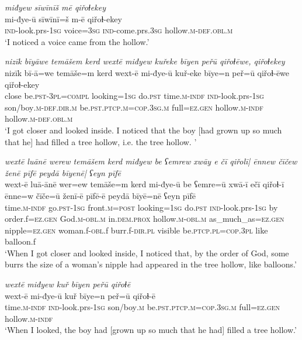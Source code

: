 \ea \label{ZQ.37}
\textit{miđyew sīwīnīš mē qiřoɫekey} \\ 
\gll mi-đye-ū sīwīnī=š m-ē qiřoɫ-ekey \\ 
 \textsc{ind-}look.prs\textsc{-\textsc{1sg}} voice\textsc{=3sg} \textsc{ind-}come.prs\textsc{.3sg} hollow\textsc{.m}\textsc{-def}\textsc{.obl}\textsc{.m} \\ 
\glt `I noticed a voice came from the hollow.'
\z 
 
\ea \label{ZQ.38}
\textit{nizīk bīyāwe temāšem kerd wextē miđyew kuřeke bīyen peřū qiřoɫēwe, qiřoɫekey} \\ 
\gll nizīk bī-ā=we temāše=m kerd wext-ē mi-đye-ū kuř-eke bīye=n peř=ū qiřoɫ-ēwe qiřoɫ-ekey \\ 
 close be\textsc{.pst}\textsc{-3pl}\textsc{=compl} looking\textsc{=\textsc{1sg}} do\textsc{.pst} time\textsc{.m}\textsc{-indf} \textsc{ind-}look.prs\textsc{-\textsc{1sg}} son/boy\textsc{.m}\textsc{-def}\textsc{.dir}\textsc{.m} be\textsc{.pst}\textsc{.ptcp}\textsc{.m}\textsc{=cop}\textsc{.3sg}\textsc{.m} full\textsc{=ez.gen} hollow\textsc{.m}\textsc{-indf} hollow\textsc{.m}\textsc{-def}\textsc{.obl}\textsc{.m} \\ 
\glt `I got closer and looked inside. I noticed that the boy [had grown up so much that he] had filled a tree hollow, i.e. the tree hollow. '
\z 
 
\ea \label{ZQ.39}
\textit{wextē luānē werew temāšem kerd miđyew be ʕemrew xwāy e čī qiřolī| ēnnew čīčew ženē pīfē peydā bīyenē| ʕeyn pīfē} \\ 
\gll wext-ē luā-ānē wer=ew temāše=m kerd mi-đye-ū be ʕemre=ū xwā-ī ečī qiřoɫ-ī ēnne=w čīče=ū ženī-ē pīfē-ē peydā bīyē=nē ʕeyn pīfē \\ 
 time\textsc{.m}\textsc{-indf} go\textsc{.pst}\textsc{-\textsc{1sg}} front\textsc{.m}\textsc{=\textsc{post}} looking\textsc{=\textsc{1sg}} do\textsc{.pst} \textsc{ind-}look.prs\textsc{-\textsc{1sg}} by order.f\textsc{=ez.gen} God\textsc{.m}\textsc{-obl}\textsc{.m} in.\textsc{dem.prox} hollow\textsc{.m}\textsc{-obl}\textsc{.m} as\_much\_as\textsc{=ez.gen} nipple\textsc{=ez.gen} woman.f\textsc{-obl}.f burr.f\textsc{-dir}\textsc{.pl} visible be\textsc{.ptcp}\textsc{.pl}\textsc{=cop}\textsc{.3pl} like balloon.f \\ 
\glt `When I got closer and looked inside, I noticed that, by the order of God, some burrs the size of a woman's nipple had appeared in the tree hollow, like balloons.'
\z 
 
\ea \label{ZQ.45}
\textit{wextē miđyew kuř bīyen peřū qiřoɫē} \\ 
\gll wext-ē mi-đye-ū kuř bīye=n peř=ū qiřoɫ-ē \\ 
 time\textsc{.m}\textsc{-indf} \textsc{ind-}look.prs\textsc{-\textsc{1sg}} son/boy\textsc{.m} be\textsc{.pst}\textsc{.ptcp}\textsc{.m}\textsc{=cop}\textsc{.3sg}\textsc{.m} full\textsc{=ez.gen} hollow\textsc{.m}\textsc{-indf} \\ 
\glt `When I looked, the boy had [grown up so much that he had] filled a tree hollow.'
\z 
 
